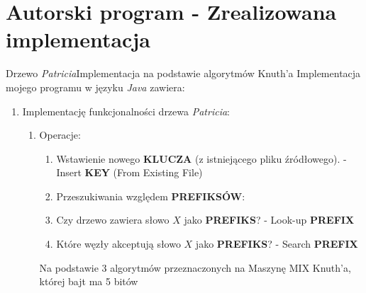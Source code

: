 \documentclass[aspectratio=1610,english]{beamer} %
\begin{document}
  	\section{Autorski program - Zrealizowana implementacja}
	\begin{frame}{Drzewo \emph{Patricia}}{Implementacja na podstawie algorytmów Knuth'a}
	    Implementacja mojego programu w języku \emph{Java} zawiera:
	    \begin{enumerate}
	        \item {\color{AGH@green} Implementację funkcjonalności drzewa \emph{Patricia}}:
            \begin{enumerate}
                \item {\color{AGH@green} Operacje:}
                \begin{enumerate}
                    \item {\color{AGH@green} Wstawienie nowego \textbf{KLUCZA}} {\color{gray} (z istniejącego pliku źródłowego)}. \newline 
                    {\scriptsize \color{gray} \hspace*{0.4cm} - Insert \textbf{KEY} \color{lightgray} (From Existing File)}
                    
                    \item Przeszukiwania względem \textbf{PREFIKSÓW}:
                    
                        \setcounter{enumiii}{0}
                        \addtolength{\itemindent}{0.7cm}
                        \item {\color{AGH@green} Czy drzewo zawiera słowo $X$ jako \textbf{PREFIKS}?} \newline 
                        {\scriptsize \color{gray} \hspace*{0.4cm} - Look-up \textbf{PREFIX}}
                        
                        \item {\color{AGH@green} Które węzły akceptują słowo $X$ jako \textbf{PREFIKS}?} \newline 
                        {\scriptsize \color{gray} \hspace*{0.4cm} - Search \textbf{PREFIX}} 
                \end{enumerate}
                
                \hspace*{-1.65cm} Na podstawie 3 algorytmów przeznaczonych na Maszynę MIX Knuth'a, której bajt ma 5 bitów \newline
                

\end{enumerate}
\end{enumerate}
\end{frame}
\end{document}
